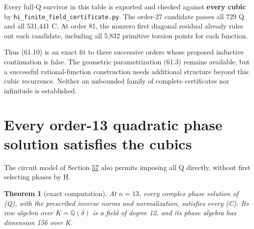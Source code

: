 \documentclass[11pt,reqno]{amsart}
\theoremstyle{plain}
\newtheorem{theorem}{Theorem}[section]
\begin{document}
Every full-Q survivor in this table is exported and checked against
\textbf{every cubic} by \texttt{hi\_\allowbreak finite\_\allowbreak field\_\allowbreak certificate.py}. The order-27
candidate passes all 729 Q and all 531,441 C. At order 81, the
nonzero first diagonal residual already rules out each candidate,
including all 5,832 primitive torsion points for each function.

Thus (61.10) is an exact fit to three successive orders whose proposed
inductive continuation is false. The geometric parametrization (61.3)
remains available, but a successful rational-function construction
needs additional structure beyond this cubic recurrence. Neither an
unbounded family of complete certificates nor infinitude is established.

\section{Every order-13 quadratic phase solution satisfies the cubics}\label{sec:62}

The circuit model of Section \hyperref[sec:57]{57} also permits imposing all Q directly,
without first selecting phases by H.

\begin{theorem}[exact computation]
At \(n=13\), every complex phase
solution of (Q), with the prescribed inverse norms and normalization,
satisfies every (C). Its row algebra over \(K=\mathbb Q(\delta)\) is
a field of degree 12, and its phase algebra has dimension 156 over K.
\end{theorem}
\end{document}
